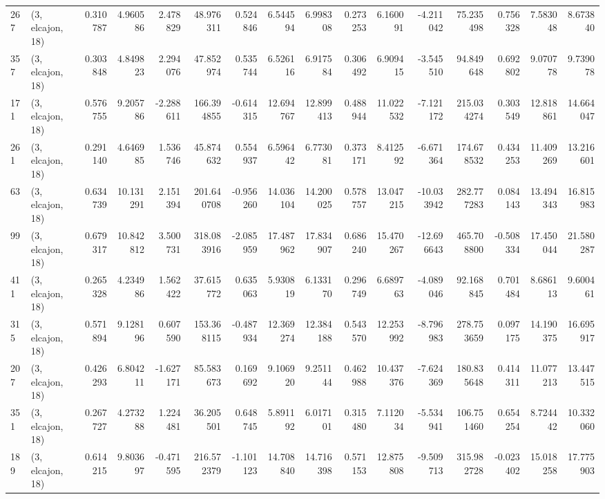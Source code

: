 \begin{tabular}{llrrrrrrrrrrrrrr}
267 &  (3, elcajon, 18) &   0.310787 &   4.960586 &   2.478829 &    48.976311 &   0.524846 &   6.544594 &   6.998308 &  0.273253 &   6.160091 &  -4.211042 &    75.235498 &   0.756328 &   7.583048 &   8.673840 \\
357 &  (3, elcajon, 18) &   0.303848 &   4.849823 &   2.294076 &    47.852974 &   0.535744 &   6.526116 &   6.917584 &  0.306492 &   6.909415 &  -3.545510 &    94.849648 &   0.692802 &   9.070778 &   9.739078 \\
171 &  (3, elcajon, 18) &   0.576755 &   9.205786 &  -2.288611 &   166.394855 &  -0.614315 &  12.694767 &  12.899413 &  0.488944 &  11.022532 &  -7.121172 &   215.034274 &   0.303549 &  12.818861 &  14.664047 \\
261 &  (3, elcajon, 18) &   0.291140 &   4.646985 &   1.536746 &    45.874632 &   0.554937 &   6.596442 &   6.773081 &  0.373171 &   8.412592 &  -6.671364 &   174.678532 &   0.434253 &  11.409269 &  13.216601 \\
63  &  (3, elcajon, 18) &   0.634739 &  10.131291 &   2.151394 &   201.640708 &  -0.956260 &  14.036104 &  14.200025 &  0.578757 &  13.047215 & -10.033942 &   282.777283 &   0.084143 &  13.494343 &  16.815983 \\
99  &  (3, elcajon, 18) &   0.679317 &  10.842812 &   3.500731 &   318.083916 &  -2.085959 &  17.487962 &  17.834907 &  0.686240 &  15.470267 & -12.696643 &   465.708800 &  -0.508334 &  17.450044 &  21.580287 \\
411 &  (3, elcajon, 18) &   0.265328 &   4.234986 &   1.562422 &    37.615772 &   0.635063 &   5.930819 &   6.133170 &  0.296749 &   6.689763 &  -4.089046 &    92.168845 &   0.701484 &   8.686113 &   9.600461 \\
315 &  (3, elcajon, 18) &   0.571894 &   9.128196 &   0.607590 &   153.368115 &  -0.487934 &  12.369274 &  12.384188 &  0.543570 &  12.253992 &  -8.796983 &   278.753659 &   0.097175 &  14.190375 &  16.695917 \\
207 &  (3, elcajon, 18) &   0.426293 &   6.804211 &  -1.627171 &    85.583673 &   0.169692 &   9.106920 &   9.251144 &  0.462988 &  10.437376 &  -7.624369 &   180.835648 &   0.414311 &  11.077213 &  13.447515 \\
351 &  (3, elcajon, 18) &   0.267727 &   4.273288 &   1.224481 &    36.205501 &   0.648745 &   5.891192 &   6.017101 &  0.315480 &   7.112034 &  -5.534941 &   106.751460 &   0.654254 &   8.724442 &  10.332060 \\
189 &  (3, elcajon, 18) &   0.614215 &   9.803697 &  -0.471595 &   216.572379 &  -1.101123 &  14.708840 &  14.716398 &  0.571153 &  12.875808 &  -9.509713 &   315.982728 &  -0.023402 &  15.018258 &  17.775903 \\

\end{tabular}

